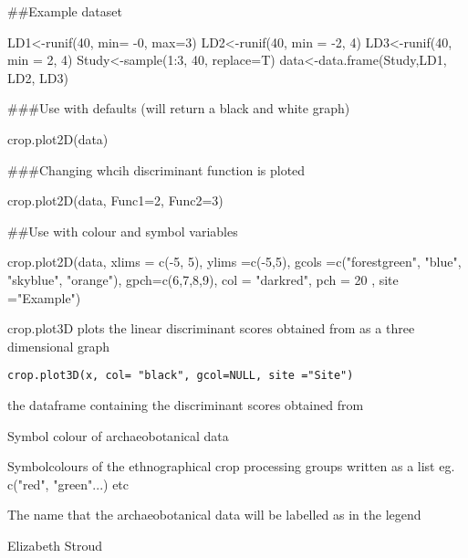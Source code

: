 \documentclass[a4paper]{book}
\begin{document}
\begin{Examples}
\begin{ExampleCode}
##Example dataset

LD1<-runif(40, min= -0, max=3)
LD2<-runif(40, min = -2, 4)
LD3<-runif(40, min = 2, 4)
Study<-sample(1:3, 40, replace=T)
data<-data.frame(Study,LD1, LD2, LD3)

###Use with defaults (will return a black and white graph)

crop.plot2D(data)

###Changing whcih discriminant function is ploted

crop.plot2D(data, Func1=2, Func2=3)

##Use with colour and symbol variables

crop.plot2D(data, xlims = c(-5, 5), ylims =c(-5,5), gcols =c("forestgreen", "blue",
"skyblue", "orange"), gpch=c(6,7,8,9), col = "darkred", pch = 20 , site ="Example")
  
\end{ExampleCode}
\end{Examples}
%
\begin{Description}\relax
crop.plot3D plots the linear discriminant scores obtained from  as a three dimensional graph
\end{Description}
%
\begin{Usage}
\begin{verbatim}
crop.plot3D(x, col= "black", gcol=NULL, site ="Site")
\end{verbatim}
\end{Usage}
%
\begin{Arguments}
\begin{ldescription}
\item[\code{x}] the dataframe containing the discriminant scores obtained from 
\item[\code{col}] Symbol colour of archaeobotanical data
\item[\code{gcol}] Symbolcolours of the ethnographical crop processing groups written as a list eg. c("red", "green"...) etc
\item[\code{site}] The name that the archaeobotanical data will be labelled as in the legend
\end{ldescription}
\end{Arguments}
%
\begin{Author}\relax
Elizabeth Stroud
\end{Author}
\end{document}
